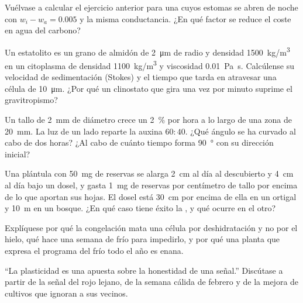 \begin{exercise}[$\star\star$]\label{exo:b2:plant-plasticity:7}
Vuélvase a calcular el ejercicio anterior para una  cuyos
estomas se abren de noche con $w_i - w_a = 0.005$ y la misma conductancia.
¿En qué factor se reduce el coste en agua del carbono?
\end{exercise}

\begin{exercise}[$\star\star$]\label{exo:b2:plant-plasticity:8}
Un estatolito es un grano de almidón de \qty{2}{\micro m} de radio y
densidad \qty{1500}{kg/m^3} en un citoplasma de densidad
\qty{1100}{kg/m^3} y viscosidad \qty{0.01}{Pa.s}. Calcúlense su velocidad
de sedimentación (Stokes) y el tiempo que tarda en atravesar una célula de
\qty{10}{\micro m}. ¿Por qué un clinostato que gira una vez por minuto
suprime el gravitropismo?
\end{exercise}

\begin{exercise}[$\star\star$]\label{exo:b2:plant-plasticity:9}
Un tallo de \qty{2}{mm} de diámetro crece un \qty{2}{\%} por hora a lo
largo de una zona de \qty{20}{mm}. La luz de un lado reparte la auxina
$60 : 40$. ¿Qué ángulo se ha curvado al cabo de dos horas? ¿Al cabo de
cuánto tiempo forma \qty{90}{\degree} con su dirección inicial?
\end{exercise}

\begin{exercise}[$\star\star\star$]\label{exo:b2:plant-plasticity:10}
Una plántula con \qty{50}{mg} de reservas se alarga \qty{2}{cm} al día al
descubierto y \qty{4}{cm} al día bajo un dosel, y gasta \qty{1}{mg} de
reservas por centímetro de tallo por encima de lo que aportan sus hojas.
El dosel está \qty{30}{cm} por encima de ella en un ortigal y \qty{10}{m}
en un bosque. ¿En qué caso tiene éxito la , y qué
ocurre en el otro?
\end{exercise}

\begin{exercise}[$\star\star\star$]\label{exo:b2:plant-plasticity:11}
Explíquese por qué la congelación mata una célula por deshidratación y no
por el hielo, qué hace una semana de frío para impedirlo, y por qué una
planta que expresa el programa del frío todo el año es enana.
\end{exercise}

\begin{exercise}[$\star\star\star$]\label{exo:b2:plant-plasticity:12}
``La plasticidad es una apuesta sobre la honestidad de una señal.''
Discútase a partir de la señal del rojo lejano, de la semana cálida de
febrero y de la mejora de cultivos que ignoran a sus vecinos.
\end{exercise}

